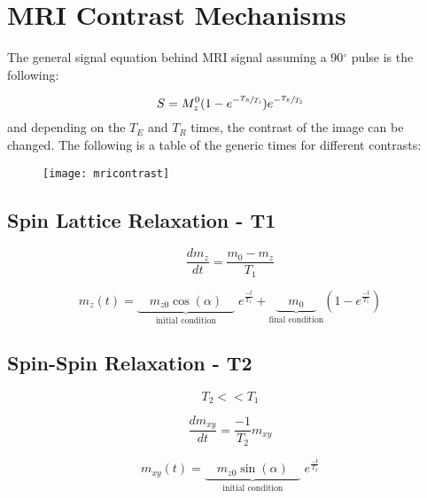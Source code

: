 \section{MRI Contrast Mechanisms}
The general signal equation behind MRI signal assuming a 90$^\circ$ pulse is the following:

\begin{equation}
S = M_z^0(1-e^{-\sfrac{T_R}{T_1}})e^{-\sfrac{T_E}{T_2}}
\end{equation}
and depending on the $T_E$ and $T_R$ times, the contrast of the image can be changed. The following is a table of the generic times for different contrasts:

\begin{figure}[h]
	\begin{center}
		\texttt{[image: mricontrast]}	
	\end{center}
\end{figure}
\subsection{Spin Lattice Relaxation - T1}
\begin{equation}
\frac{dm_z}{dt}= \frac{m_0-m_z}{T_1}
\end{equation}

\begin{equation}
m_z(t) = \underset{\text{initial condition}}{\underbrace{\quad m_{z0}\cos\left(\alpha\right)\quad}}\; e^{\frac{-t}{T_1}} + \underset{\text{final condition}}{\underbrace{\quad m_0\quad}}\left(1-e^{\frac{-t}{T_1}}\right)
\end{equation}



\subsection{Spin-Spin Relaxation - T2}
\begin{equation}
T_2 << T_1
\end{equation}

\begin{equation}
\frac{dm_{xy}}{dt}= \frac{-1}{T_2}m_{xy}
\end{equation}

\begin{equation}
m_{xy}(t) = \underset{\text{initial condition}}{\underbrace{\quad m_{z0}\sin\left(\alpha\right)\quad}}\; e^{\frac{-t}{T_2}}
\end{equation}

